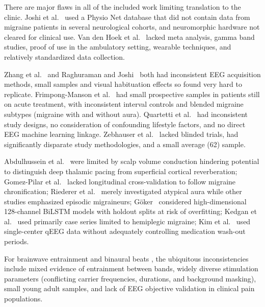 \documentclass[12pt, a4paper]{report}
\begin{document}
There are major flaws in all of the included work limiting translation to the clinic. Joshi et al.~\cite{JoshiMatharu2025} used a Physio Net database that did not contain data from migraine patients in several neurological cohorts, and neuromorphic hardware not cleared for clinical use. Van den Hoek et al.~\cite{VanDenHoek2024} lacked meta analysis, gamma band studies, proof of use in the ambulatory setting, wearable techniques, and relatively standardized data collection.

Zhang et al.~\cite{Zhang2023} and Raghuraman and Joshi~\cite{RaghuramanJoshi2024} both had inconsistent EEG acquisition methods, small samples and visual habituation effects so found very hard to replicate. Frimpong-Manson et al.~\cite{FrimpongManson2024} had small prospective samples in patients still on acute treatment, with inconsistent interval controls and blended migraine subtypes (migraine with and without aura). Quartetti et al.~\cite{Quartetti2025} had inconsistent study designs, no consideration of confounding lifestyle factors, and no direct EEG machine learning linkage. Zebhauser et al.~\cite{Zebhauser2024} lacked blinded trials, had significantly disparate study methodologies, and a small average (62) sample.

Abdulhussein et al.~\cite{AbdulhusseinAldeen2024} were limited by scalp volume conduction hindering potential to distinguish deep thalamic pacing from superficial cortical reverberation; Gomez-Pilar et al.~\cite{GomezPilar2022} lacked longitudinal cross-validation to follow migraine chronification; Riederer et al.~\cite{Riederer2023} merely investigated atypical aura while other studies emphasized episodic migraineurs; Göker~\cite{Goker2023} considered high-dimensional 128-channel BiLSTM models with holdout splits at risk of overfitting; Kedgan et al.~\cite{Kedgan2025} used primarily case series limited to hemiplegic migraine; Kim et al.~\cite{Kim2023} used single-center qEEG data without adequately controlling medication wash-out periods.

For brainwave entrainment and binaural beats \cite{Melnichuk2025,Yang2025,Xiong2025,KahathuduwaBlume2025,Shamsi2024,Sudre2024,Ingendoh2023,Fan2024,Mosheshe2024,ChockboondeeJatupornpoonsub2023,Dabiri2022,CoronaGonzalez2021,AlShargie2022,WangZhang2022,BasuBanerjee2023,Hamid2025}, the ubiquitous inconsistencies include mixed evidence of entrainment between bands, widely diverse stimulation parameters (conflicting carrier frequencies, durations, and background masking), small young adult samples, and lack of EEG objective validation in clinical pain populations.
\end{document}
